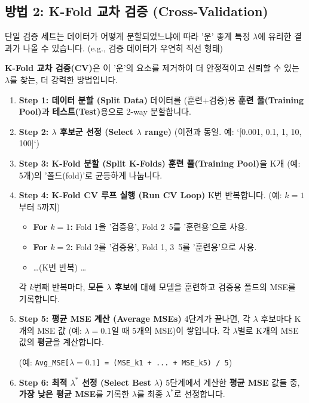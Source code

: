 \documentclass[11pt,a4paper]{book}
\theoremstyle{definition}
\begin{document}
\subsection{방법 2: K-Fold 교차 검증 (Cross-Validation)}

단일 검증 세트는 데이터가 어떻게 분할되었느냐에 따라 '운' 좋게 특정 $\lambda$에 유리한 결과가 나올 수 있습니다. (e.g., 검증 데이터가 우연히 직선 형태)

\textbf{K-Fold 교차 검증(CV)}은 이 '운'의 요소를 제거하여 더 안정적이고 신뢰할 수 있는 $\lambda$를 찾는, 더 강력한 방법입니다.

\begin{enumerate}
    \item \textbf{Step 1: 데이터 분할 (Split Data)}
    데이터를 (훈련+검증)용 \textbf{훈련 풀(Training Pool)}과 \textbf{테스트(Test)}용으로 2-way 분할합니다.

    \item \textbf{Step 2: $\lambda$ 후보군 선정 (Select $\lambda$ range)}
    (이전과 동일. 예: `[0.001, 0.1, 1, 10, 100]`)

    \item \textbf{Step 3: K-Fold 분할 (Split K-Folds)}
    \textbf{훈련 풀(Training Pool)}을 K개 (예: 5개)의 '폴드(fold)'로 균등하게 나눕니다.

    \item \textbf{Step 4: K-Fold CV 루프 실행 (Run CV Loop)}
    K번 반복합니다. (예: $k=1$부터 $5$까지)
    \begin{itemize}
        \item \textbf{For $k=1$:} Fold 1을 '검증용', Fold 2~5를 '훈련용'으로 사용.
        \item \textbf{For $k=2$:} Fold 2를 '검증용', Fold 1, 3~5를 '훈련용'으로 사용.
        \item \dots (K번 반복) \dots
    \end{itemize}
    각 $k$번째 반복마다, \textbf{모든 $\lambda$ 후보}에 대해 모델을 훈련하고 검증용 폴드의 MSE를 기록합니다.

    \item \textbf{Step 5: 평균 MSE 계산 (Average MSEs)}
    4단계가 끝나면, 각 $\lambda$ 후보마다 K개의 MSE 값 (예: $\lambda=0.1$일 때 5개의 MSE)이 쌓입니다.
    각 $\lambda$별로 K개의 MSE 값의 \textbf{평균}을 계산합니다.
    
    (예: \texttt{Avg\_MSE[$\lambda=0.1$] = (MSE\_k1 + ... + MSE\_k5) / 5})

    \item \textbf{Step 6: 최적 $\lambda^*$ 선정 (Select Best $\lambda$)}
    5단계에서 계산한 \textbf{평균 MSE} 값들 중, \textbf{가장 낮은 평균 MSE}를 기록한 $\lambda$를 최종 $\lambda^*$로 선정합니다.


\end{enumerate}
\end{document}

